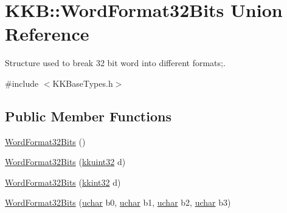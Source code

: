 \hypertarget{union_k_k_b_1_1_word_format32_bits}{}\section{K\+KB\+:\+:Word\+Format32\+Bits Union Reference}
\label{union_k_k_b_1_1_word_format32_bits}


Structure used to break 32 bit word into different formats;.  




{\ttfamily \#include $<$K\+K\+Base\+Types.\+h$>$}

\subsection*{Public Member Functions}
\begin{DoxyCompactItemize}
\item 
\hyperlink{union_k_k_b_1_1_word_format32_bits_abcd5db82f5e511c364b3f8daff4867c2}{Word\+Format32\+Bits} ()
\item 
\hyperlink{union_k_k_b_1_1_word_format32_bits_a81edf4cd657f56bd7c910e8b9f9904d0}{Word\+Format32\+Bits} (\hyperlink{namespace_k_k_b_af8d832f05c54994a1cce25bd5743e19a}{kkuint32} d)
\item 
\hyperlink{union_k_k_b_1_1_word_format32_bits_a52e78ab3dba1ffa22870e641ed91ec21}{Word\+Format32\+Bits} (\hyperlink{namespace_k_k_b_a8fa4952cc84fda1de4bec1fbdd8d5b1b}{kkint32} d)
\item 
\hyperlink{union_k_k_b_1_1_word_format32_bits_a28378cd4873f9ac51f487e732937d932}{Word\+Format32\+Bits} (\hyperlink{namespace_k_k_b_ace9969169bf514f9ee6185186949cdf7}{uchar} b0, \hyperlink{namespace_k_k_b_ace9969169bf514f9ee6185186949cdf7}{uchar} b1, \hyperlink{namespace_k_k_b_ace9969169bf514f9ee6185186949cdf7}{uchar} b2, \hyperlink{namespace_k_k_b_ace9969169bf514f9ee6185186949cdf7}{uchar} b3)
\end{DoxyCompactItemize}
